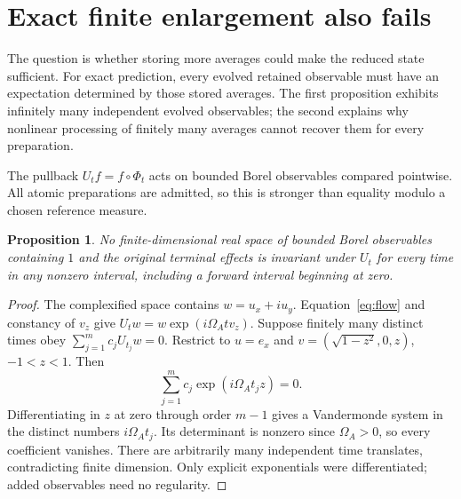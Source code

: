 \documentclass[11pt,a4paper]{article}
\newtheorem{proposition}{Proposition}
\begin{document}
\section{Exact finite enlargement also fails}
The question is whether storing more averages could make the reduced state
sufficient. For exact prediction, every evolved retained observable must have
an expectation determined by those stored averages. The first proposition
exhibits infinitely many independent evolved observables; the second explains
why nonlinear processing of finitely many averages cannot recover them for
every preparation.

The pullback $U_tf=f\circ\Phi_t$ acts on bounded Borel observables compared
pointwise. All atomic preparations are admitted, so this is stronger than
equality modulo a chosen reference measure.

\begin{proposition}
No finite-dimensional real space of bounded Borel observables containing
$1$ and the original terminal effects is invariant under $U_t$ for every
time in any nonzero interval, including a forward interval beginning at zero.
\end{proposition}
\begin{proof}
The complexified space contains $w=u_x+iu_y$. Equation~\eqref{eq:flow} and
constancy of $v_z$ give $U_tw=w\exp(i\Omega_A t v_z)$. Suppose finitely
many distinct times obey $\sum_{j=1}^m c_jU_{t_j}w=0$. Restrict to
$u=e_x$ and $v=(\sqrt{1-z^2},0,z)$, $-1<z<1$. Then
\begin{equation}
 \sum_{j=1}^m c_j\exp(i\Omega_A t_jz)=0.
\end{equation}
Differentiating in $z$ at zero through order $m-1$ gives a Vandermonde system
in the distinct numbers $i\Omega_A t_j$. Its determinant is nonzero since
$\Omega_A>0$, so every coefficient vanishes. There are arbitrarily many
independent time translates, contradicting finite dimension. Only explicit
exponentials were differentiated; added observables need no regularity.
\end{proof}
\end{document}
